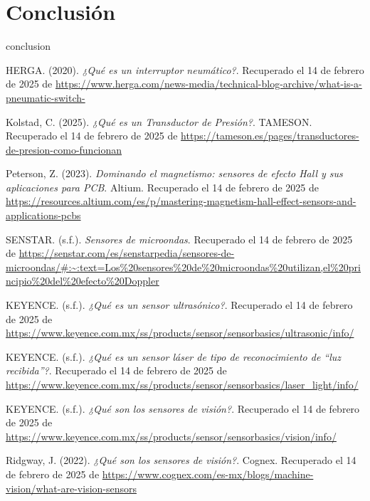 \section{Conclusión} \label{sec:conclusion}
\vspace{10mm}
conclusion
\newpage  %
\begin{thebibliography}{99}
	\vspace{10mm}
	
	HERGA. (2020). 
	\textit{¿Qué es un interruptor neumático?}. Recuperado el 14 de febrero de 2025 de \url{https://www.herga.com/news-media/technical-blog-archive/what-is-a-pneumatic-switch-}
	
	Kolstad, C. (2025). 
	\textit{¿Qué es un Transductor de Presión?}. TAMESON. Recuperado el 14 de febrero de 2025 de \url{https://tameson.es/pages/transductores-de-presion-como-funcionan}
	
	Peterson, Z. (2023). 
	\textit{Dominando el magnetismo: sensores de efecto Hall y sus aplicaciones para PCB}. Altium. Recuperado el 14 de febrero de 2025 de \url{https://resources.altium.com/es/p/mastering-magnetism-hall-effect-sensors-and-applications-pcbs}
	
	SENSTAR. (s.f.). 
	\textit{Sensores de microondas}. Recuperado el 14 de febrero de 2025 de \url{https://senstar.com/es/senstarpedia/sensores-de-microondas/#:~:text=Los%20sensores%20de%20microondas%20utilizan,el%20principio%20del%20efecto%20Doppler}
	
	KEYENCE. (s.f.). 
	\textit{¿Qué es un sensor ultrasónico?}. Recuperado el 14 de febrero de 2025 de \url{https://www.keyence.com.mx/ss/products/sensor/sensorbasics/ultrasonic/info/}
	
	KEYENCE. (s.f.). 
	\textit{¿Qué es un sensor láser de tipo de reconocimiento de “luz recibida”?}. Recuperado el 14 de febrero de 2025 de \url{https://www.keyence.com.mx/ss/products/sensor/sensorbasics/laser_light/info/}
	
	KEYENCE. (s.f.). 
	\textit{¿Qué son los sensores de visión?}. Recuperado el 14 de febrero de 2025 de \url{https://www.keyence.com.mx/ss/products/sensor/sensorbasics/vision/info/}
	
	Ridgway, J. (2022). 
	\textit{¿Qué son los sensores de visión?}. Cognex. Recuperado el 14 de febrero de 2025 de \url{https://www.cognex.com/es-mx/blogs/machine-vision/what-are-vision-sensors}
	

\end{thebibliography}

